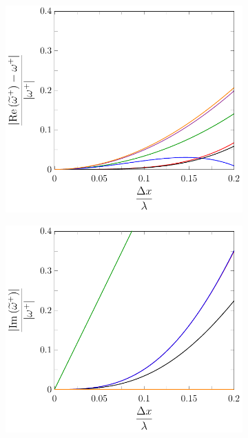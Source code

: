 \begin{figure}
	\centering
	\begin{subfigure}{0.5\textwidth}
		\includegraphics[width=\textwidth]{./chp4/figures/New/ReDispu0Fill.pdf}
	\end{subfigure}%
	\begin{subfigure}{0.5\textwidth}
		\includegraphics[width=\textwidth]{./chp4/figures/New/ImDispu0Fill.pdf}

\end{subfigure}
\end{figure}
